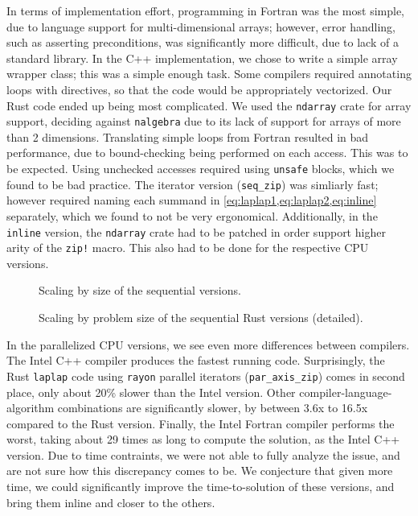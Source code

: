\documentclass[british]{scrreprt}
\begin{document}
In terms of implementation effort, programming in Fortran was the most simple, due to language support for multi-dimensional arrays; however, error handling, such as asserting preconditions, was significantly more difficult, due to lack of a standard library. In the C++ implementation, we chose to write a simple array wrapper class; this was a simple enough task. Some compilers required annotating loops with directives, so that the code would be appropriately vectorized. Our Rust code ended up being most complicated. We used the \texttt{ndarray} crate for array support, deciding against \texttt{nalgebra} due to its lack of support for arrays of more than 2 dimensions. Translating simple loops from Fortran resulted in bad performance, due to bound-checking being performed on each access. This was to be expected. Using unchecked accesses required using \texttt{unsafe} blocks, which we found to be bad practice. The iterator version (\texttt{seq\_zip}) was simliarly fast; however required naming each summand in \cref{eq:laplap1,eq:laplap2,eq:inline} separately, which we found to not be very ergonomical. Additionally, in the \texttt{inline} version, the \texttt{ndarray} crate had to be patched in order support higher arity of the \texttt{zip!} macro. This also had to be done for the respective CPU versions.

\begin{figure}
	\centering
	{\sffamily
		
	}
	\caption{Scaling by size of the sequential versions.}
	\label{fig:scaling-seq}
\end{figure}

\begin{figure}
	\centering
	{\sffamily
		
	}
	\caption{Scaling by problem size of the sequential Rust versions (detailed).}
	\label{fig:scaling-seq-rust}
\end{figure}

In the parallelized CPU versions, we see even more differences between compilers. The Intel C++ compiler produces the fastest running code. Surprisingly, the Rust \texttt{laplap} code using \texttt{rayon} parallel iterators (\texttt{par\_axis\_zip}) comes in second place, only about 20\% slower than the Intel version. Other compiler-language-algorithm combinations are significantly slower, by between 3.6x to 16.5x compared to the Rust version. Finally, the Intel Fortran compiler performs the worst, taking about 29 times as long to compute the solution, as the Intel C++ version. Due to time contraints, we were not able to fully analyze the issue, and are not sure how this discrepancy comes to be. We conjecture that given more time, we could significantly improve the time-to-solution of these versions, and bring them inline and closer to the others.
\end{document}
